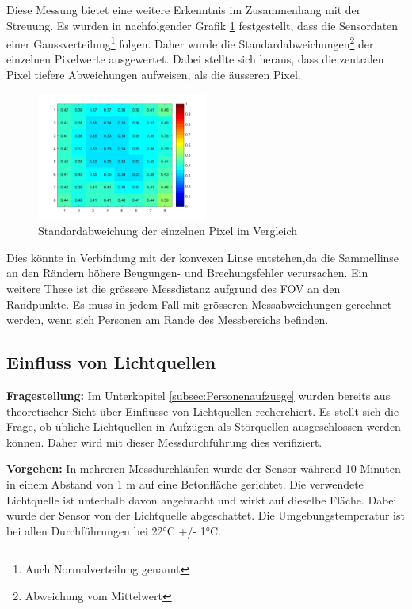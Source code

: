 Diese Messung bietet eine weitere Erkenntnis im Zusammenhang mit der Streuung. Es wurden in nachfolgender Grafik \ref{fig:Streuung} festgestellt, dass die Sensordaten einer Gaussverteilung\footnote[15]{Auch Normalverteilung genannt} folgen. Daher wurde die Standardabweichungen\footnote[16]{Abweichung vom Mittelwert} der einzelnen Pixelwerte ausgewertet. Dabei stellte sich heraus, dass die zentralen Pixel tiefere Abweichungen aufweisen, als die äusseren Pixel.

\begin{figure}[H]
	\centering
	\includegraphics[width=0.5\textwidth]
	{fig/Distanz_140cm_std_.jpg}
	\caption[Standardabweichung der einzelnen Pixel im Vergleich]{Standardabweichung der einzelnen Pixel im Vergleich}
	\label{fig:Streuung}
\end{figure}

Dies könnte in Verbindung mit der konvexen Linse entstehen,da die Sammellinse an den Rändern höhere Beugungen- und Brechungsfehler  verursachen. Ein weitere These ist die grössere Messdistanz aufgrund des \ac{FOV} an den Randpunkte. Es muss in jedem Fall mit grösseren Messabweichungen gerechnet werden, wenn sich Personen am Rande des Messbereichs befinden.

\subsection{Einfluss von Lichtquellen}
\textbf{Fragestellung:} Im Unterkapitel \ref{subsec:Personenaufzuege} wurden bereits aus theoretischer Sicht über Einflüsse von Lichtquellen recherchiert. Es stellt sich die Frage, ob übliche Lichtquellen in Aufzügen als Störquellen ausgeschlossen werden können. Daher wird mit dieser Messdurchführung dies verifiziert.

\textbf{Vorgehen:} In mehreren Messdurchläufen wurde der Sensor während 10 Minuten in einem Abstand von 1 m auf eine Betonfläche gerichtet. Die verwendete Lichtquelle ist unterhalb davon angebracht und wirkt auf dieselbe Fläche. Dabei wurde der Sensor von der Lichtquelle abgeschattet. Die Umgebungstemperatur ist bei allen Durchführungen bei 22°C +/- 1°C.

